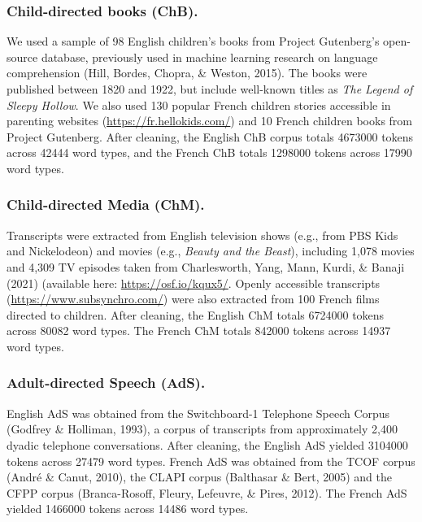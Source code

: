 \documentclass[10pt, letterpaper]{article}
\begin{document}
\hypertarget{child-directed-books-chb.}{%
\subsubsection{Child-directed books
(ChB).}\label{child-directed-books-chb.}}

We used a sample of 98 English children's books from Project Gutenberg's
open-source database, previously used in machine learning research on
language comprehension (Hill, Bordes, Chopra, \& Weston, 2015). The
books were published between 1820 and 1922, but include well-known
titles as \emph{The Legend of Sleepy Hollow}. We also used 130 popular
French children stories accessible in parenting websites
(\url{https://fr.hellokids.com/}) and 10 French children books from
Project Gutenberg. After cleaning, the English ChB corpus totals 4673000
tokens across 42444 word types, and the French ChB totals 1298000 tokens
across 17990 word types.

\hypertarget{child-directed-media-chm.}{%
\subsubsection{Child-directed Media
(ChM).}\label{child-directed-media-chm.}}

Transcripts were extracted from English television shows (e.g., from PBS
Kids and Nickelodeon) and movies (e.g., \emph{Beauty and the Beast}),
including 1,078 movies and 4,309 TV episodes taken from Charlesworth,
Yang, Mann, Kurdi, \& Banaji (2021) (available here:
\url{https://osf.io/kqux5/}. Openly accessible transcripts
(\url{https://www.subsynchro.com/}) were also extracted from 100 French
films directed to children. After cleaning, the English ChM totals
6724000 tokens across 80082 word types. The French ChM totals 842000
tokens across 14937 word types.

\hypertarget{adult-directed-speech-ads.}{%
\subsubsection{Adult-directed Speech
(AdS).}\label{adult-directed-speech-ads.}}

English AdS was obtained from the Switchboard-1 Telephone Speech Corpus
(Godfrey \& Holliman, 1993), a corpus of transcripts from approximately
2,400 dyadic telephone conversations. After cleaning, the English AdS
yielded 3104000 tokens across 27479 word types. French AdS was obtained
from the TCOF corpus (André \& Canut, 2010), the CLAPI corpus (Balthasar
\& Bert, 2005) and the CFPP corpus (Branca-Rosoff, Fleury, Lefeuvre, \&
Pires, 2012). The French AdS yielded 1466000 tokens across 14486 word
types.
\end{document}

